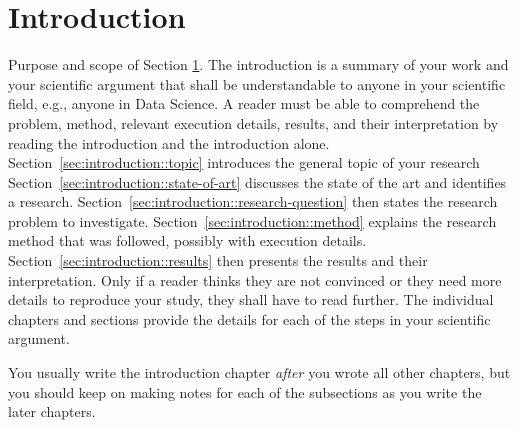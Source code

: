 \documentclass[
	a4paper,
	pagesize,
	pdftex,
	12pt,
	ngerman,
	fleqn,
	final,
	]{scrartcl}
\theoremstyle{plain}
\theoremstyle{definition}
\begin{document}
\section{Introduction}\label{sec:introduction}
	\textsf{Purpose and scope of Section \ref{sec:introduction}}. The introduction is a summary of your work and your scientific argument that shall be understandable to anyone in your scientific field, e.g., anyone in Data Science. A reader must be able to comprehend the problem, method, relevant execution details, results, and their interpretation by reading the introduction and the introduction alone.
	Section~\ref{sec:introduction::topic} introduces the general topic of your research
	Section~\ref{sec:introduction::state-of-art} discusses the state of the art and identifies a research.
	Section~\ref{sec:introduction::research-question} then states the research problem to investigate.
	Section~\ref{sec:introduction::method} explains the research method that was followed, possibly with execution details.
	Section~\ref{sec:introduction::results} then presents the results and their interpretation. Only if a reader thinks they are not convinced or they need more details to reproduce your study, they shall have to read further. The individual chapters and sections provide the details for each of the steps in your scientific argument.
	
	You usually write the introduction chapter \emph{after} you wrote all other chapters, but you should keep on making notes for each of the subsections as you write the later chapters.
	
\end{document}
